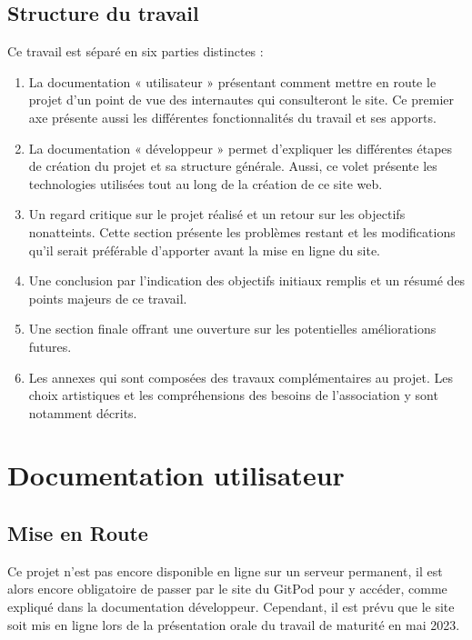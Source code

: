 \documentclass[a4,10pt,french]{sphinxmanual}
\begin{document}
\section{Structure du travail}
\label{\detokenize{introduction:structure-du-travail}}
\sphinxAtStartPar
Ce travail est séparé en six parties distinctes :
\begin{enumerate}
%
\item {} 
\sphinxAtStartPar
La documentation « utilisateur » présentant comment mettre en route le projet d’un point de vue des internautes qui consulteront le site. Ce premier axe présente aussi les différentes fonctionnalités du travail et ses apports.

\item {} 
\sphinxAtStartPar
La documentation « développeur » permet d’expliquer les différentes étapes de création du projet et sa structure générale. Aussi, ce volet présente les technologies utilisées tout au long de la création de ce site web.

\item {} 
\sphinxAtStartPar
Un regard critique sur le projet réalisé et un retour sur les objectifs non\sphinxhyphen{}atteints. Cette section présente les problèmes restant et les modifications qu’il serait préférable d’apporter avant la mise en ligne du site.

\item {} 
\sphinxAtStartPar
Une conclusion par l’indication des objectifs initiaux remplis et un résumé des points majeurs de ce travail.

\item {} 
\sphinxAtStartPar
Une section finale offrant une ouverture sur les potentielles améliorations futures.

\item {} 
\sphinxAtStartPar
Les annexes qui sont composées des travaux complémentaires au projet. Les choix artistiques et les compréhensions des besoins de l’association y sont notamment décrits.

\end{enumerate}


\chapter{Documentation utilisateur}
\label{\detokenize{chapitre-01:documentation-utilisateur}}\label{\detokenize{chapitre-01::doc}}

\section{Mise en Route}
\label{\detokenize{chapitre-01:mise-en-route}}
\sphinxAtStartPar
Ce projet n’est pas encore disponible en ligne sur un serveur permanent, il est alors encore obligatoire de passer par le site du GitPod pour y accéder, comme expliqué dans la documentation développeur. Cependant, il est prévu que le site soit mis en ligne lors de la présentation orale du travail de maturité en mai 2023.
\end{document}
